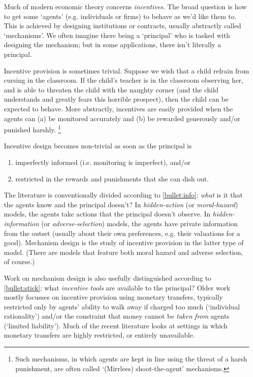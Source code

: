 \documentclass[11pt,letterpaper,reqno,oneside]{book}
\begin{document}
Much of modern economic theory concerns \emph{incentives.}
The broad question is how to get some `agents' (e.g. individuals or firms) to behave as we'd like them to.
This is achieved by designing institutions or contracts, usually abstractly called `mechanisms'.
We often imagine there being a `principal' who is tasked with designing the mechanism; but in some applications, there isn't literally a principal.

Incentive provision is sometimes trivial.
Suppose we wish that a child refrain from cursing in the classroom.
If the child's teacher is in the classroom observing her, and is able to threaten the child with the naughty corner (and the child understands and greatly fears this horrible prospect), then the child can be expected to behave.
More abstractly, incentives are easily provided when the agents can (a) be monitored accurately and (b) be rewarded generously and/or punished harshly.%
	\footnote{Such mechanisms, in which agents are kept in line using the threat of a harsh punishment, are often called `(Mirrlees) shoot-the-agent' mechanisms.}

Incentive design becomes non-trivial as soon as the principal is
%
\begin{enumerate}[label=(\alph*)]

	\item \label{bullet:info}
	imperfectly informed (i.e. monitoring is imperfect), and/or

	\item \label{bullet:stick}
	restricted in the rewards and punishments that she can dish out.

\end{enumerate}
%
The literature is conventionally divided according to \ref{bullet:info}: \emph{what} is it that the agents know and the principal doesn't?
In \emph{hidden-action} (or \emph{moral-hazard}) models, the agents take actions that the principal doesn't observe.
In \emph{hidden-information} (or \emph{adverse-selection}) models, the agents have private information from the outset (usually about their own preferences, e.g. their valuations for a good).
Mechanism design is the study of incentive provision in the latter type of model.
(There are models that feature both moral hazard and adverse selection, of course.)

Work on mechanism design is also usefully distinguished according to \ref{bullet:stick}: what \emph{incentive tools} are available to the principal?
Older work mostly focusses on incentive provision using monetary transfers,
typically restricted only by agents' ability to walk away if charged too much (`individual rationality') and/or the constraint that money cannot be \emph{taken from} agents (`limited liability').
Much of the recent literature looks at settings in which monetary transfers are highly restricted, or entirely unavailable.
\end{document}

